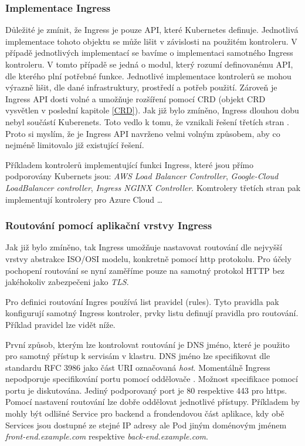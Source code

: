 \subsubsection{Implementace Ingress}
Důležité je zmínit, že Ingress je pouze API, které Kubernetes definuje. Jednotlivá implementace tohoto objektu se může lišit v závislosti na použitém kontroleru. V případě jednotlivých implementací se bavíme o implementaci samotného Ingress kontroleru. V tomto případě se jedná o modul, který rozumí definovanému API, dle kterého plní potřebné funkce. Jednotlivé implementace kontrolerů se mohou výrazně lišit, dle dané infrastruktury, prostředí a potřeb použití. Zároveň je Ingress API dosti volné a umožňuje rozšíření pomocí CRD (objekt CRD vysvětlen v poslední kapitole \ref{CRD}). Jak již bylo zmíněno, Ingress dlouhou dobu nebyl součástí Kuberenets. Toto vedlo k tomu, že vznikali řešení třetích stran \cite{kashin_2021_gateway}. Proto si myslím, že je Ingress API navrženo velmi volným způsobem, aby co nejméně limitovalo již existující řešení.

Příkladem kontrolerů implementující funkci Ingress, které jsou přímo podporovány Kubernets  jsou: \textit{AWS Load Balancer Controller}, \textit{Google-Cloud LoadBalancer controller}, \textit{Ingress NGINX Controller}. Komtrolery třetích stran pak implementují kontrolery pro Azure Cloud \ldots \cite{thekubernetesauthors_2023_ingress}

\subsubsection{Routování pomocí aplikační vrstvy Ingress}
Jak již bylo zmíněno, tak Ingress umožňuje nastavovat routování dle nejvyšší vrstvy abstrakce ISO/OSI modelu, konkretně pomocí http protokolu. Pro účely pochopení routování se nyní zaměříme pouze na samotný protokol HTTP bez jakéhokoliv zabezpečeni jako \textit{TLS}.

Pro definici routování Ingres používá list pravidel (rules). Tyto pravidla pak konfigurují samotný Ingress kontroler, prvky listu definují pravidla pro routování. Příklad pravidel lze vidět níže.


První způsob, kterým lze kontrolovat routování je DNS jméno, které je použito pro samotný přístup k servisám v klastru. DNS jméno lze specifikovat dle standardu RFC 3986 jako část URI označovaná \textit{host}. Momentálně Ingress nepodporuje specifikování portu pomocí oddělovače \uv{:}. Možnost specifikace pomocí portu je diskutována.  Jediný podporovaný port je 80 respektive 443 pro https. Pomocí nastavení routování lze dobře oddělovat jednotlivé přístupy. Příkladem by mohly být odlišné Service pro backend a frondendovou část aplikace, kdy obě Services jsou dostupné ze stejné IP adresy ale Pod jiným doménovým jménem \textit{front-end.example.com} respektive \textit{back-end.example.com}.

